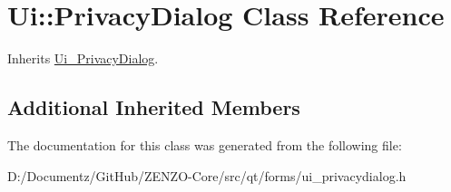 \hypertarget{class_ui_1_1_privacy_dialog}{}\section{Ui\+::Privacy\+Dialog Class Reference}
\label{class_ui_1_1_privacy_dialog}


Inherits \mbox{\hyperlink{class_ui___privacy_dialog}{Ui\+\_\+\+Privacy\+Dialog}}.

\subsection*{Additional Inherited Members}


The documentation for this class was generated from the following file\+:\begin{DoxyCompactItemize}
\item 
D\+:/\+Documentz/\+Git\+Hub/\+Z\+E\+N\+Z\+O-\/\+Core/src/qt/forms/ui\+\_\+privacydialog.\+h\end{DoxyCompactItemize}
